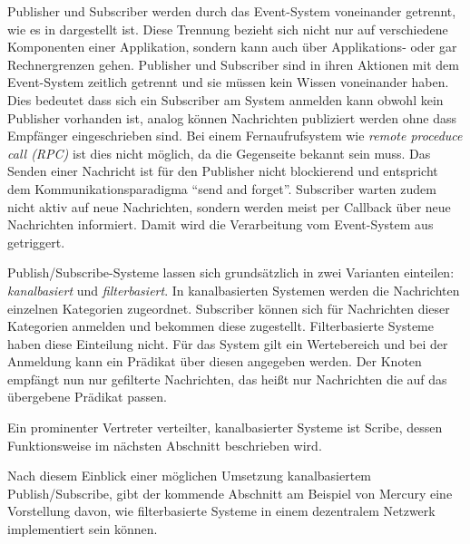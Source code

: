 Publisher und Subscriber werden durch das Event-System voneinander getrennt, wie es in  dargestellt ist. Diese Trennung bezieht sich nicht nur auf verschiedene Komponenten einer Applikation, sondern kann auch über Applikations- oder gar Rechnergrenzen gehen. Publisher und Subscriber sind in ihren Aktionen mit dem Event-System zeitlich getrennt und sie müssen kein Wissen voneinander haben. Dies bedeutet dass sich ein Subscriber am System anmelden kann obwohl kein Publisher vorhanden ist, analog können Nachrichten publiziert werden ohne dass Empfänger eingeschrieben sind. Bei einem Fernaufrufsystem wie \emph{remote proceduce call (RPC)} \cite{Birrell1984Implementing} ist dies nicht möglich, da die Gegenseite bekannt sein muss. Das Senden einer Nachricht ist für den Publisher nicht blockierend und entspricht dem Kommunikationsparadigma ``send and forget''. Subscriber warten zudem nicht aktiv auf neue Nachrichten, sondern werden meist per Callback über neue Nachrichten informiert. Damit wird die Verarbeitung vom Event-System aus getriggert. 

Publish/Subscribe-Systeme lassen sich grundsätzlich in zwei Varianten einteilen: \emph{kanalbasiert} und \emph{filterbasiert}. In kanalbasierten Systemen werden die Nachrichten einzelnen Kategorien zugeordnet. Subscriber können sich für Nachrichten dieser Kategorien anmelden und bekommen diese zugestellt. Filterbasierte Systeme haben diese Einteilung nicht. Für das System gilt ein Wertebereich und bei der Anmeldung kann ein Prädikat über diesen angegeben werden. Der Knoten empfängt nun nur gefilterte Nachrichten, das heißt nur Nachrichten die auf das übergebene Prädikat passen.

Ein prominenter Vertreter verteilter, kanalbasierter Systeme ist Scribe, dessen Funktionsweise im nächsten Abschnitt beschrieben wird.



Nach diesem Einblick einer möglichen Umsetzung kanalbasiertem Publish/Subscribe, gibt der kommende Abschnitt am Beispiel von Mercury eine Vorstellung davon, wie filterbasierte Systeme in einem dezentralem Netzwerk implementiert sein können.






